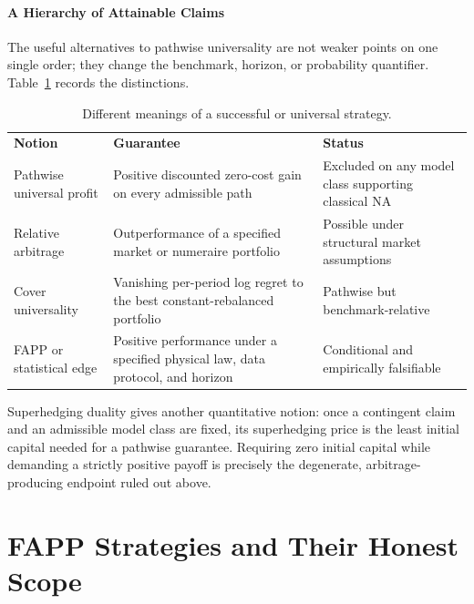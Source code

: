 \documentclass[aps,pra,reprint,superscriptaddress,amsmath,amssymb,floatfix]{revtex4-2}
\theoremstyle{plain}
\theoremstyle{definition}
\theoremstyle{remark}
\begin{document}
\paragraph{A Hierarchy of Attainable Claims}

The useful alternatives to pathwise universality are not weaker points on one
single order; they change the benchmark, horizon, or probability quantifier.
Table~\ref{tab:hierarchy} records the distinctions.

\begin{table}[ht]
\caption{\label{tab:hierarchy}Different meanings of a successful or universal strategy.}
\centering
\begin{ruledtabular}
\begin{tabular}{p{}p{}p{}}
\textbf{Notion} & \textbf{Guarantee} & \textbf{Status} \\
\colrule
Pathwise universal profit
& Positive discounted zero-cost gain on every admissible path
& Excluded on any model class supporting classical NA \\
Relative arbitrage
& Outperformance of a specified market or numeraire portfolio
& Possible under structural market assumptions \\
Cover universality
& Vanishing per-period log regret to the best constant-rebalanced portfolio
& Pathwise but benchmark-relative \\
FAPP or statistical edge
& Positive performance under a specified physical law, data protocol, and horizon
& Conditional and empirically falsifiable \\
\end{tabular}
\end{ruledtabular}
\end{table}

Superhedging duality gives another quantitative notion: once a contingent
claim and an admissible model class are fixed, its superhedging price is the
least initial capital needed for a pathwise guarantee. Requiring zero initial
capital while demanding a strictly positive payoff is precisely the
degenerate, arbitrage-producing endpoint ruled out above.

\section{FAPP Strategies and Their Honest Scope}
\label{sec:fapp}
\end{document}
